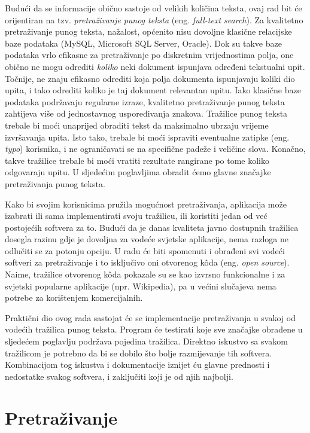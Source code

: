 \documentclass[a4paper,twoside,12pt]{scrreprt}
\begin{document}
Budući da se informacije obično sastoje od velikih količina teksta, ovaj rad bit će orijentiran na tzv. \textit{pretraživanje punog teksta} (eng. \textit{full-text search}). Za kvalitetno pretraživanje punog teksta, nažalost, općenito nisu dovoljne klasične relacijske baze podataka (MySQL, Microsoft SQL Server, Oracle). Dok su takve baze podataka vrlo efikasne za pretraživanje po diskretnim vrijednostima polja, one obično ne mogu odrediti \textit{koliko} neki dokument ispunjava određeni tekstualni upit. Točnije, ne znaju efikasno odrediti koja polja dokumenta ispunjavaju koliki dio upita, i tako odrediti koliko je taj dokument relevantan upitu. Iako klasične baze podataka podržavaju regularne izraze, kvalitetno pretraživanje punog teksta zahtijeva više od jednostavnog uspoređivanja znakova. Tražilice punog teksta trebale bi moći unaprijed obraditi tekst da maksimalno ubrzaju vrijeme izvršavanja upita. Isto tako, trebale bi moći ispraviti eventualne zatipke (eng. \textit{typo}) korisnika, i ne ograničavati se na specifične padeže i veličine slova. Konačno, takve tražilice trebale bi moći vratiti rezultate rangirane po tome koliko odgovaraju upitu. U sljedećim poglavljima obradit ćemo glavne značajke pretraživanja punog teksta.

Kako bi svojim korisnicima pružila mogućnost pretraživanja, aplikacija može izabrati ili sama implementirati svoju tražilicu, ili koristiti jedan od već postojećih softvera za to. Budući da je danas kvaliteta javno dostupnih tražilica dosegla razinu gdje je dovoljna za vodeće svjetske aplikacije, nema razloga ne odlučiti se za potonju opciju. U radu će biti spomenuti i obrađeni svi vodeći softveri za pretraživanje i to isključivo oni otvorenog kôda (eng. \textit{open source}). Naime, tražilice otvorenog kôda pokazale su se kao izvrsno funkcionalne i za svjetski popularne aplikacije (npr. Wikipedia), pa u većini slučajeva nema potrebe za korištenjem komercijalnih.

Praktični dio ovog rada sastojat će se implementacije pretraživanja u svakoj od vodećih tražilica punog teksta. Program će testirati koje sve značajke obrađene u sljedećem poglavlju podržava pojedina tražilica. Direktno iskustvo sa svakom tražilicom je potrebno da bi se dobilo što bolje razmijevanje tih softvera. Kombinacijom tog iskustva i dokumentacije iznijet ću glavne prednosti i nedostatke svakog softvera, i zaključiti koji je od njih najbolji.

\chapter{Pretraživanje} \label{searching}
\end{document}
